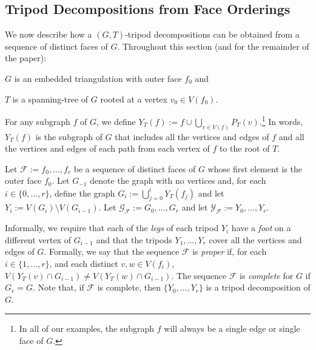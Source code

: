 \documentclass{patmorin}
\begin{document}

\subsection{Tripod Decompositions from Face Orderings}
\label{orderings}

We now describe how a $(G,T)$-tripod decompositions can be obtained from a sequence of distinct faces of $G$.  Throughout this section (and for the remainder of the paper):
\begin{compactitem}
   \item $G$ is an embedded triangulation with outer face $f_0$ and
   \item $T$ is a spanning-tree of $G$ rooted at a vertex $v_0\in V(f_0)$.
\end{compactitem}
For any subgraph $f$ of $G$, we define $Y_T(f):=f\cup \bigcup_{v\in V(f)} P_T(v)$.\footnote{In all of our examples, the subgraph $f$ will always be a single edge or single face of $G$.}  In words, $Y_T(f)$ is the subgraph of $G$ that includes all the vertices and edges of $f$ and all the vertices and edges of each path from each vertex of $f$ to the root of $T$.

Let $\mathcal{F}:=f_0,\ldots,f_{r}$ be a sequence of distinct faces of $G$ whose first element is the outer face $f_0$. Let $G_{-1}$ denote the graph with no vertices and, for each $i\in\{0,\ldots,r\}$, define the graph $G_i:=\bigcup_{j=0}^i Y_T(f_j)$ and let $Y_i:=V(G_i)\setminus V(G_{i-1})$.  Let $\mathcal{G_F}:= G_0,\ldots,G_{r}$ and let $\mathcal{Y_F}:=Y_0,\ldots,Y_r$.  

Informally, we require that each of the \emph{legs} of each tripod $Y_i$ have  a \emph{foot} on a different vertex of $G_{i-1}$ and that the tripods $Y_1,\ldots,Y_r$ cover all the vertices and edges of $G$. Formally, we say that the sequence $\mathcal{F}$ is \emph{proper} if, for each $i\in\{1,\ldots,r\}$, and each distinct $v,w\in V(f_i)$, $V(Y_T(v)\cap G_{i-1})\neq V(Y_T(w)\cap G_{i-1})$.  The sequence $\mathcal{F}$ is \emph{complete} for $G$ if $G_r=G$.  Note that, if $\mathcal{F}$ is complete, then $\{Y_0,\ldots,Y_r\}$ is a tripod decomposition of $G$.
\end{document}
